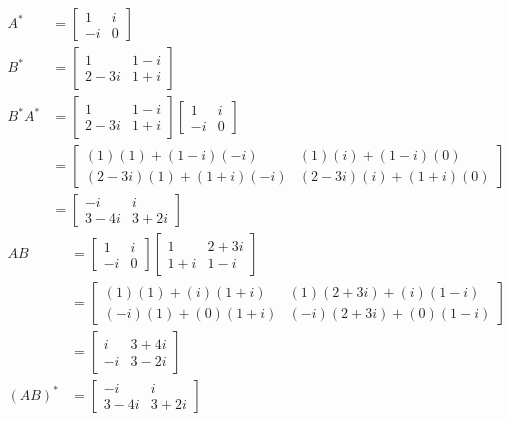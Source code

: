 \begin{solution}
\begin{align*}
A^* &=
\begin{bmatrix}
1 & i \\
-i & 0
\end{bmatrix} \\
B^* &=
\begin{bmatrix}
1 & 1-i \\
2-3i & 1+i
\end{bmatrix} \\
B^*A^* &= 
\begin{bmatrix}
1 & 1-i \\
2-3i & 1+i
\end{bmatrix} 
\begin{bmatrix}
1 & i \\
-i & 0
\end{bmatrix} \\
&=
\begin{bmatrix}
(1)(1) + (1-i)(-i) & (1)(i) + (1-i)(0)  \\
(2-3i)(1) + (1+i)(-i) & (2-3i)(i) + (1+i)(0)
\end{bmatrix} \\
&=
\begin{bmatrix}
-i & i \\
3-4i & 3+2i
\end{bmatrix} 
\end{align*}
\begin{align*}
AB &= 
\begin{bmatrix}
1 & i \\
-i & 0
\end{bmatrix} 
\begin{bmatrix}
1 & 2+3i \\
1+i & 1-i
\end{bmatrix} \\
&= 
\begin{bmatrix}
(1)(1)+(i)(1+i) & (1)(2+3i) + (i)(1-i) \\
(-i)(1)+(0)(1+i) & (-i)(2+3i) + (0)(1-i)
\end{bmatrix} \\
&= 
\begin{bmatrix}
i & 3+4i \\
-i & 3-2i
\end{bmatrix} \\
(AB)^* &= 
\begin{bmatrix}
-i & i \\
3-4i & 3+2i
\end{bmatrix} 
\end{align*}
\end{solution}

